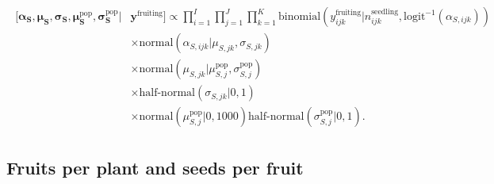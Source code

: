 \documentclass[12pt, oneside, titlepage]{article}   	%
\begin{document}
%


\begin{align}
  \begin{split}
 [  \bm{\alpha_S} , \bm{\mu_S} , \bm{\sigma_S} , \bm{\mu^\mathrm{pop}_S}, \bm{\sigma^\mathrm{pop}_S} | & \bm{y^{\mathrm{fruiting}}}  ] \propto \prod_{i=1}^{I}   \prod_{j=1}^{J}  \prod_{k=1}^{K} 
   \mathrm{binomial} ( y^{\mathrm{fruiting}}_{ijk} | n^\mathrm{seedling}_{ijk}, \mathrm{logit}^{-1}( \alpha_{S,ijk} ) ) 
   \\ & \times \mathrm{normal} ( \alpha_{S,ijk}  | \mu_{S,jk}, \sigma{_{S,jk} })
  \\ & \times \mathrm{normal} ( \mu_{S,jk}  | \mu^\mathrm{pop}_{S,j}, \sigma^\mathrm{pop}_{S,j} )
  \\ & \times \textrm{half-normal} ( \sigma_{S,jk} | 0,1)
  \\ & \times \mathrm{normal} ( \mu^\mathrm{pop}_{S,j} | 0 , 1000 ) \textrm{half-normal} ( \sigma^\mathrm{pop}_{S,j} | 0,1).
  \end{split}
\end{align}


\clearpage
\newpage

\subsection*{Fruits per plant and seeds per fruit}
\end{document}
